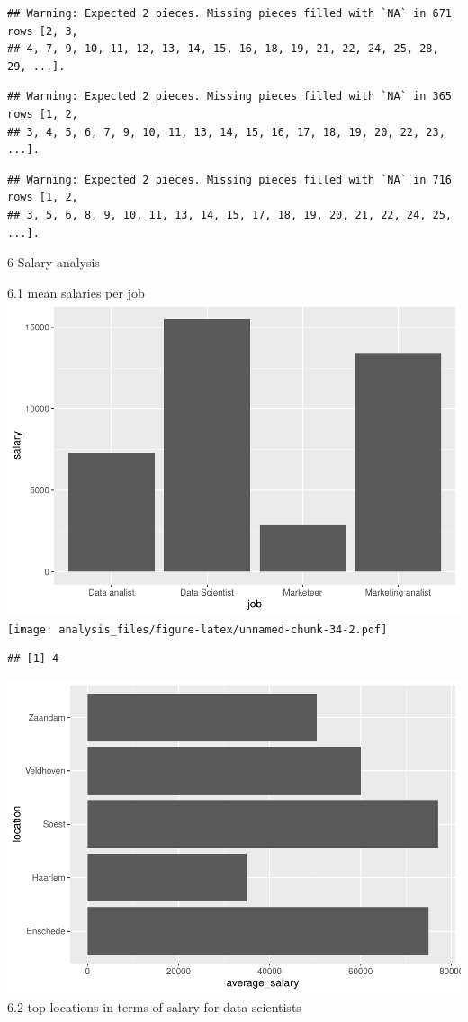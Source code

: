 \documentclass[
]{article}
\begin{document}
\begin{verbatim}
## Warning: Expected 2 pieces. Missing pieces filled with `NA` in 671 rows [2, 3,
## 4, 7, 9, 10, 11, 12, 13, 14, 15, 16, 18, 19, 21, 22, 24, 25, 28, 29, ...].
\end{verbatim}

\begin{verbatim}
## Warning: Expected 2 pieces. Missing pieces filled with `NA` in 365 rows [1, 2,
## 3, 4, 5, 6, 7, 9, 10, 11, 13, 14, 15, 16, 17, 18, 19, 20, 22, 23, ...].
\end{verbatim}

\begin{verbatim}
## Warning: Expected 2 pieces. Missing pieces filled with `NA` in 716 rows [1, 2,
## 3, 5, 6, 8, 9, 10, 11, 13, 14, 15, 17, 18, 19, 20, 21, 22, 24, 25, ...].
\end{verbatim}

6 Salary analysis

6.1 mean salaries per job
\includegraphics{analysis_files/figure-latex/unnamed-chunk-34-1.pdf}
\texttt{[image: analysis\_files/figure-latex/unnamed-chunk-34-2.pdf]}

\begin{verbatim}
## [1] 4
\end{verbatim}

\includegraphics{analysis_files/figure-latex/unnamed-chunk-35-1.pdf} 6.2
top locations in terms of salary for data scientists
\end{document}
